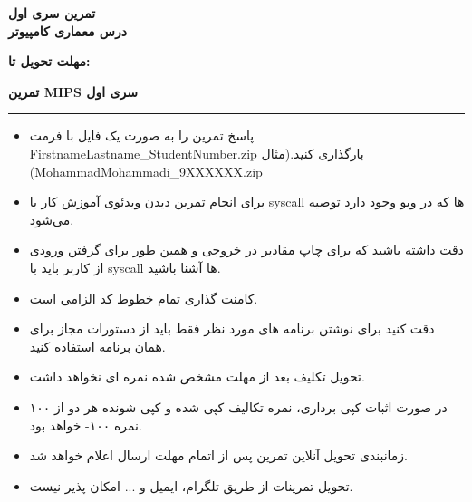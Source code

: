 
\def \Subject {تمرین سری اول}
\def \Course {درس معماری کامپیوتر}
\def \Report {تمرین MIPS سری اول}

\begin{center}
\vspace{.4cm}
{\bf {\huge \Subject}}\\
{\bf \Large \Course}
\vspace{.2cm}
\end{center}


{\bf مهلت تحویل تا: \date{1402/01/15}}    
\hspace{\fill} 
{\bf \Large \Report}
\vspace{0.1cm}
\hrule
\vspace{0.8cm}


\begin{itemize}
  \item  پاسخ تمرین را به صورت یک فایل با فرمت FirstnameLastname\_StudentNumber.zip بارگذاری کنید.(مثال (MohammadMohammadi\_9XXXXXX.zip
  \item برای انجام تمرین دیدن ویدئوی آموزش کار با syscall ها که در ویو وجود دارد توصیه می‌شود.
  \item دقت داشته باشید که برای چاپ مقادیر در خروجی و همین طور برای گرفتن ورودی از کاربر باید با syscall ها آشنا باشید.
  \item کامنت گذاری تمام خطوط کد الزامی است.
  \item دقت کنید برای نوشتن برنامه های مورد نظر فقط باید از دستورات مجاز برای همان برنامه استفاده کنید.
  \item تحویل تکلیف بعد از مهلت مشخص شده نمره ای نخواهد داشت.
  \item در صورت اثبات کپی برداری، نمره تکالیف کپی شده و کپی شونده هر دو از ۱۰۰ نمره ۱۰۰- خواهد بود.
  \item زمانبندی تحویل آنلاین تمرین پس از اتمام مهلت ارسال اعلام خواهد شد.
  \item تحویل تمرینات از طریق تلگرام، ایمیل و ... امکان پذیر نیست.
\end{itemize}


